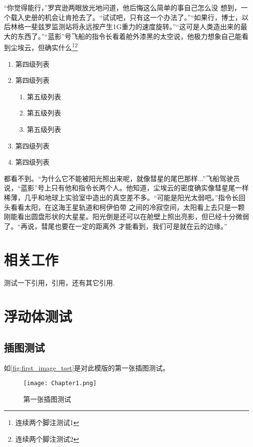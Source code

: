“你觉得能行，”罗宾逊两眼放光地问道，他后悔这么简单的事自己怎么没 想到，一个载入史册的机会让肯抢去了。“试试吧，只有这一个办法了。”“如果行，博士，以后林格一斐兹罗监测站将永远按产生1G重力的速度旋转。”“这可是人类造出来的最大的东西了。”“蓝影”号飞船的指令长看着舱外漆黑的太空说，他极力想象自己能看到尘埃云，但确实什么\footnote{连续两个脚注测试1}\footnote{连续两个脚注测试2}
\begin{enumerate}
	\item 第四级列表
	\item 第四级列表
	\begin{enumerate}
		\item 第五级列表
		\item 第五级列表
		\item 第五级列表
	\end{enumerate}
	\item 第四级列表
	\item 第四级列表
\end{enumerate}
都看不到。“为什么它不能被阳光照出来呢，就像彗星的尾巴那样...”飞船驾驶员说，“蓝影”号上只有他和指令长两个人。他知道，尘埃云的密度确实像彗星尾一样稀薄，几乎和地球上实验室中造出的真空差不多。“可能是阳光太弱吧。”指令长回头看看太阳，在这海王星轨道和柯伊伯带 之间的冷寂空间，太阳看上去只是一颗刚能看出圆盘形状的大星星。阳光倒是还可以在舱壁上照出亮影，但已经十分微弱了。“再说，彗尾也要在一定的距离外 才能看到，我们可是就在云的边缘。”

\section{相关工作}
测试一下引用\cite{shi_chinas_2010}，引用\cite{shi2010china,hata2014soi,muhammad2011development}，还有其它引用\cite{shi2010china,muhammad2011development,lamport1994latex}.

\section{浮动体测试}
\subsection{插图测试}
如\autoref{fig:first_image_tset}是对此模版的第一张插图测试。

\begin{figure}[htbp]
	\centering
	\texttt{[image: Chapter1.png]}
	\caption{第一张插图测试}\label{fig:first_image_tset}
\end{figure}

